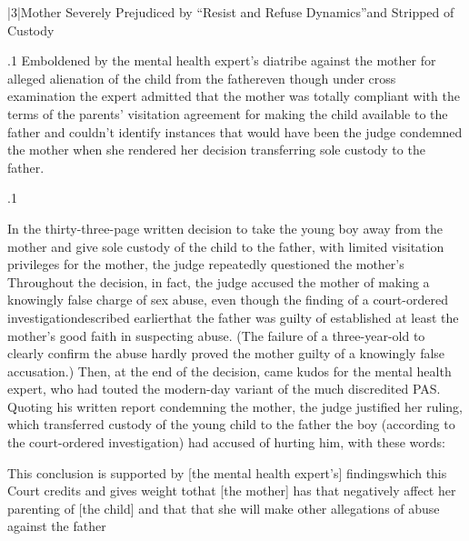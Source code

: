 \documentclass[11pt, twoside]{article}
\begin{document}
{\s|3|{Mother Severely Prejudiced by ``Resist and Refuse Dynamics''\mdash{}and Stripped of Custody}

\p.1{%
\noindent{}Emboldened by the mental health expert’s diatribe against the mother
for alleged alienation of the child from the father\mdash{}even though under
cross examination the expert admitted that the mother was totally compliant with the terms of the parents’ visitation agreement for making the
child available to the father and couldn’t identify instances that would
have been \mdash{}the judge
condemned the mother when she rendered her decision transferring
sole custody to the father.
}%

\p.1{%
In the thirty-three-page written decision to take the young boy
away from the mother and give sole custody of the child to the father, with limited visitation privileges for the mother, the judge repeatedly questioned the mother’s  Throughout the decision, in fact, the judge accused the mother of making
a knowingly false charge of sex abuse, even though the finding of
a court-ordered investigation\mdash{}described earlier\mdash{}that the father was
guilty of  established at least the mother’s
good faith in suspecting abuse. (The failure of a three-year-old to
clearly confirm the abuse hardly proved the mother guilty of a knowingly false accusation.) Then, at the end of the decision, came kudos for the mental health expert, who had touted the modern-day
variant of the much discredited PAS. Quoting his written report condemning the mother, the judge justified her ruling, which transferred
custody of the young child to the father the boy (according to the
court-ordered investigation) had accused of hurting him, with these
words:

\begin{blockQuote}
This conclusion is supported by [the mental health expert’s]
findings\mdash{}which this Court credits and gives weight to\mdash{}that [the
mother] has  that
negatively affect her parenting of [the child] and that  that she will make other allegations of abuse against
the father 
\end{blockQuote}

}%

}
\end{document}
